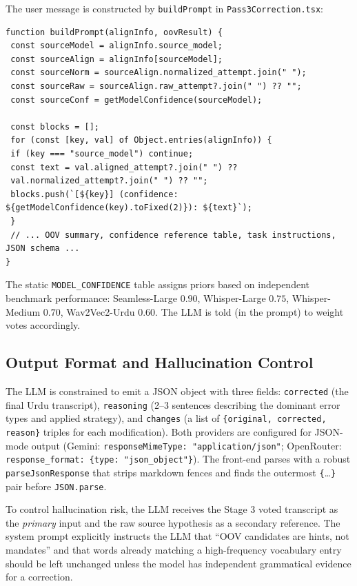 The user message is constructed by \texttt{buildPrompt} in \texttt{Pass3Correction.tsx}:

\begin{lstlisting}[caption={Stage 4 user-prompt builder (excerpt from \texttt{Pass3Correction.tsx}).},label={lst:llm-prompt}]
function buildPrompt(alignInfo, oovResult) {
 const sourceModel = alignInfo.source_model;
 const sourceAlign = alignInfo[sourceModel];
 const sourceNorm = sourceAlign.normalized_attempt.join(" ");
 const sourceRaw = sourceAlign.raw_attempt?.join(" ") ?? "";
 const sourceConf = getModelConfidence(sourceModel);

 const blocks = [];
 for (const [key, val] of Object.entries(alignInfo)) {
 if (key === "source_model") continue;
 const text = val.aligned_attempt?.join(" ") ??
 val.normalized_attempt?.join(" ") ?? "";
 blocks.push(`[${key}] (confidence: ${getModelConfidence(key).toFixed(2)}): ${text}`);
 }
 // ... OOV summary, confidence reference table, task instructions, JSON schema ...
}
\end{lstlisting}

The static \texttt{MODEL\_CONFIDENCE} table assigns priors based on independent benchmark performance: Seamless-Large $0.90$, Whisper-Large $0.75$, Whisper-Medium $0.70$, Wav2Vec2-Urdu $0.60$. The LLM is told (in the prompt) to weight votes accordingly.

\subsection{Output Format and Hallucination Control}
\label{ssec:llm-format}

The LLM is constrained to emit a JSON object with three fields: \texttt{corrected} (the final Urdu transcript), \texttt{reasoning} (2--3 sentences describing the dominant error types and applied strategy), and \texttt{changes} (a list of \texttt{\{original, corrected, reason\}} triples for each modification). Both providers are configured for JSON-mode output (Gemini: \texttt{responseMimeType: "application/json"}; OpenRouter: \texttt{response\_format: \{type: "json\_object"\}}). The front-end parses with a robust \texttt{parseJsonResponse} that strips markdown fences and finds the outermost \texttt{\{}\ldots\texttt{\}} pair before \texttt{JSON.parse}.

To control hallucination risk, the LLM receives the Stage 3 voted transcript as the \emph{primary} input and the raw source hypothesis as a secondary reference. The system prompt explicitly instructs the LLM that ``OOV candidates are hints, not mandates'' and that words already matching a high-frequency vocabulary entry should be left unchanged unless the model has independent grammatical evidence for a correction.

